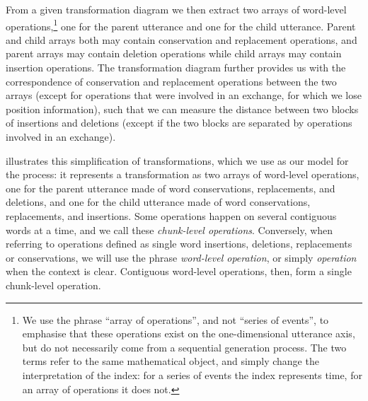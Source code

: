 From a given transformation diagram we then extract two arrays of
word-level operations,\footnote{We use the phrase \enquote{array of
  operations}, and not \enquote{series of events}, to emphasise that
  these operations exist on the one-dimensional utterance axis, but do
  not necessarily come from a sequential generation process. The two
  terms refer to the same mathematical object, and simply change the
  interpretation of the index: for a series of events the index
  represents time, for an array of operations it does not.} one for the
parent utterance and one for the child utterance. Parent and child
arrays both may contain conservation and replacement operations, and
parent arrays may contain deletion operations while child arrays may
contain insertion operations. The transformation diagram further
provides us with the correspondence of conservation and replacement
operations between the two arrays (except for operations that were
involved in an exchange, for which we lose position information), such
that we can measure the distance between two blocks of insertions and
deletions (except if the two blocks are separated by operations involved
in an exchange).

 illustrates this simplification of
transformations, which we use as our model for the process: it
represents a transformation as two arrays of word-level operations, one
for the parent utterance made of word conservations, replacements, and
deletions, and one for the child utterance made of word conservations,
replacements, and insertions. Some operations happen on several
contiguous words at a time, and we call these \emph{chunk-level
operations}. Conversely, when referring to operations defined as single
word insertions, deletions, replacements or conservations, we will use
the phrase \emph{word-level operation}, or simply \emph{operation} when
the context is clear. Contiguous word-level operations, then, form a
single chunk-level operation.

